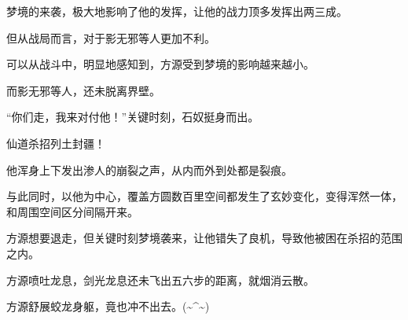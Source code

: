 \begin{this_body}
梦境的来袭，极大地影响了他的发挥，让他的战力顶多发挥出两三成。

但从战局而言，对于影无邪等人更加不利。

可以从战斗中，明显地感知到，方源受到梦境的影响越来越小。

而影无邪等人，还未脱离界壁。

“你们走，我来对付他！”关键时刻，石奴挺身而出。

仙道杀招列土封疆！

他浑身上下发出渗人的崩裂之声，从内而外到处都是裂痕。

与此同时，以他为中心，覆盖方圆数百里空间都发生了玄妙变化，变得浑然一体，和周围空间区分间隔开来。

方源想要退走，但关键时刻梦境袭来，让他错失了良机，导致他被困在杀招的范围之内。

方源喷吐龙息，剑光龙息还未飞出五六步的距离，就烟消云散。

方源舒展蛟龙身躯，竟也冲不出去。(\~{}\^{}\~{})

\end{this_body}

